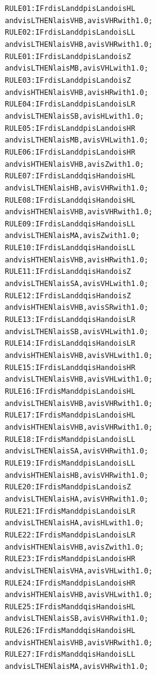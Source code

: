 \documentclass[11pt,twoside]{article}
\begin{document}
\begin{multicols}{2}
\begin{scriptsize}
\begin{alltt}
RULE 01: IF rd is L and dp is L and o is HL
    and v is L THEN la is VHB, av is VHR with 1.0;
RULE 02: IF rd is L and dp is L and o is LL
    and v is L THEN la is VHB, av is VHR with 1.0;
RULE 01: IF rd is L and dp is L and o is Z
    and v is L THEN la is MB, av is VHL with 1.0;
RULE 03: IF rd is L and dp is L and o is Z
     and v is H THEN la is VHB, av is HR with 1.0;
RULE 04: IF rd is L and dp is L and o is LR
    and v is L THEN la is SB, av is HL with 1.0;
RULE 05: IF rd is L and dp is L and o is HR
    and v is L THEN la is MB, av is VHL with 1.0;
RULE 06: IF rd is L and dp is L and o is HR
     and v is H THEN la is VHB, av is Z with 1.0;
RULE 07: IF rd is L and dq is H and o is HL
    and v is L THEN la is HB, av is VHR with 1.0;
RULE 08: IF rd is L and dq is H and o is HL
    and v is H THEN la is VHB, av is VHR with 1.0;
RULE 09: IF rd is L and dq is H and o is LL
    and v is L THEN la is MA, av is Z with 1.0;
RULE 10: IF rd is L and dq is H and o is LL
    and v is H THEN la is VHB, av is HR with 1.0;
RULE 11: IF rd is L and dq is H and o is Z
    and v is L THEN la is SA, av is VHL with 1.0;
RULE 12: IF rd is L and dq is H and o is Z
    and v is H THEN la is VHB, av is SR with 1.0;
RULE 13: IF rd is L and dq is H and o is LR
    and v is L THEN la is SB, av is VHL with 1.0;
RULE 14: IF rd is L and dq is H and o is LR
    and v is H THEN la is VHB, av is VHL with 1.0;
RULE 15: IF rd is L and dq is H and o is HR
    and v is L THEN la is VHB, av is VHL with 1.0;
RULE 16: IF rd is M and dp is L and o is HL
    and v is L THEN la is VHB, av is VHR with 1.0;
RULE 17: IF rd is M and dp is L and o is HL
    and v is H THEN la is VHB, av is VHR with 1.0;
RULE 18: IF rd is M and dp is L and o is LL
    and v is L THEN la is SA, av is VHR with 1.0;
RULE 19: IF rd is M and dp is L and o is LL
    and v is H THEN la is HB, av is VHR with 1.0;
RULE 20: IF rd is M and dp is L and o is Z
    and v is L THEN la is HA, av is VHR with 1.0;
RULE 21: IF rd is M and dp is L and o is LR
    and v is L THEN la is HA, av is HL with 1.0;
RULE 22: IF rd is M and dp is L and o is LR
    and v is H THEN la is VHB, av is Z with 1.0;
RULE 23: IF rd is M and dp is L and o is HR
    and v is L THEN la is VHA, av is VHL with 1.0;
RULE 24: IF rd is M and dp is L and o is HR
    and v is H THEN la is VHB, av is VHL with 1.0;
RULE 25: IF rd is M and dq is H and o is HL
    and v is L THEN la is SB, av is VHR with 1.0;
RULE 26: IF rd is M and dq is H and o is HL
    and v is H THEN la is VHB, av is VHR with 1.0;
RULE 27: IF rd is M and dq is H and o is LL
    and v is L THEN la is MA, av is VHR with 1.0;

\end{alltt}
\end{scriptsize}
\end{multicols}
\end{document}
